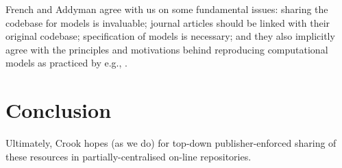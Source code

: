 \documentclass[jou]{apa6}
\begin{document}
French and Addyman agree with us on some fundamental issues: sharing the codebase for models is invaluable; journal articles should be linked with their original codebase; specification of models is necessary; and they also implicitly agree with the principles and motivations behind reproducing computational models as practiced by e.g., . 

\section{Conclusion}

Ultimately, Crook hopes (as we do) for top-down publisher-enforced sharing of these resources in partially-centralised on-line repositories.




\end{document}
